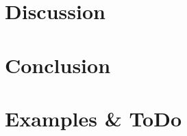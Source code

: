 \chapter{Discussion}
\label{chap:Discussion}


\chapter{Conclusion}
\label{chap:conclusion}


\appendix	%

%






%



\chapter{Examples \& ToDo}

\clearpage
\listoftodos

